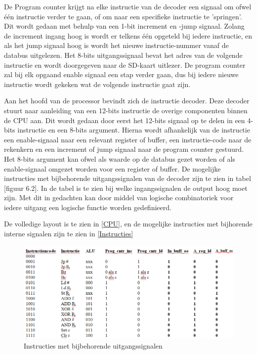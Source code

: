 \documentclass[oneside,dutch]{tudelft-report}
\begin{document}
De Program counter krijgt na elke instructie van de decoder een signaal om ofwel één instructie verder te gaan, of om naar een specifieke instructie te 'springen'. Dit wordt gedaan met behulp van een 1-bit increment en -jump signaal. Zolang de increment ingang hoog is wordt er telkens één opgeteld bij iedere instructie, en als het jump signaal hoog is wordt het nieuwe instructie-nummer vanaf de databus uitgelezen. Het 8-bits uitgangssignaal bevat het adres van de volgende instructie en wordt doorgegeven naar de SD-kaart uitlezer. De program counter zal bij elk opgaand enable signaal een stap verder gaan, dus bij iedere nieuwe instructie wordt gekeken wat de volgende instructie gaat zijn.


Aan het hoofd van de processor bevindt zich de instructie decoder. Deze decoder stuurt naar aanleiding van een 12-bits instructie de overige componenten binnen de CPU aan. Dit wordt gedaan door eerst het 12-bits signaal op te delen in een 4-bits instructie en een 8-bits argument. Hierna wordt afhankelijk van de instructie een enable-signaal naar een relevant register of buffer, een instructie-code naar de rekenkern en een increment of jump signaal naar de program counter gestuurd. Het 8-bits argument kan ofwel als waarde op de databus gezet worden of als enable-signaal omgezet worden voor een register of buffer. De mogelijke instructies met bijbehorende uitgangssignalen van de decoder zijn te zien in tabel [figuur 6.2]. In de tabel is te zien bij welke ingangssignalen de output hoog moet zijn. Met dit in gedachten kan door middel van logische combinatoriek voor iedere uitgang een logische functie worden gedefinieerd.

De volledige layout is te zien in \autoref{CPU}, en de mogelijke instructies met bijhorende interne signalen zijn te zien in \autoref{Instructies}

\begin{figure}[H]
\begin{center}
\includegraphics[width=12cm]{tabel}
\caption{Instructies met bijbehorende uitgangssignalen}
\label{Instructies}
\end{center}
\end{figure}
\end{document}
